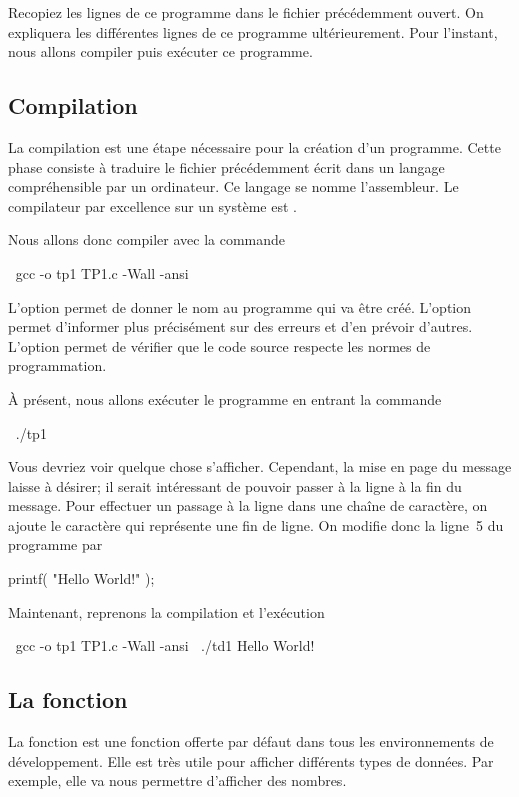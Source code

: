 \documentclass[a4paper]{article}
\begin{document}
			Recopiez les lignes de ce programme dans le fichier précédemment ouvert.
			On expliquera les différentes lignes de ce programme ultérieurement.
			Pour l'instant, nous allons compiler puis exécuter ce programme.
		\subsection{Compilation}
			La compilation est une étape nécessaire pour la création d'un programme.
			Cette phase consiste à traduire le fichier précédemment écrit dans un langage compréhensible par un ordinateur.
			Ce langage se nomme l'assembleur.
			Le compilateur par excellence sur un système  est .

			Nous allons donc compiler avec la commande
			\begin{Code*}
$~$ gcc -o tp1 TP1.c -Wall -ansi
			\end{Code*}
			L'option  permet de donner le nom au programme qui va être créé.
			L'option  permet d'informer plus précisément sur des erreurs et d'en prévoir d'autres.
			L'option  permet de vérifier que le code source respecte les normes de programmation.

			À présent, nous allons exécuter le programme en entrant la commande
			\begin{Code*}
$~$ ./tp1
			\end{Code*}
			Vous devriez voir quelque chose s'afficher.
			Cependant, la mise en page du message laisse à désirer; il serait intéressant de pouvoir passer à la ligne à la fin du message.
			Pour effectuer un passage à la ligne dans une chaîne de caractère, on ajoute le caractère  qui représente une fin de ligne.
			On modifie donc la ligne~5 du programme par
			\begin{Code*}[numbers=left,firstnumber=5]
	printf( "Hello World!\n" );
			\end{Code*}
			Maintenant, reprenons la compilation et l'exécution
			\begin{Code*}
$~$ gcc -o tp1 TP1.c -Wall -ansi
$~$ ./td1
Hello World!
$~$
			\end{Code*}
		\subsection{La fonction }
			La fonction  est une fonction offerte par défaut dans tous les environnements de développement.
			Elle est très utile pour afficher différents types de données.
			Par exemple, elle va nous permettre d'afficher des nombres.
\end{document}
